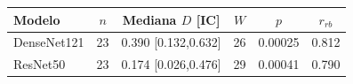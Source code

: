 \begin{tabular}{lccccc}
\toprule
Modelo & $n$ & Mediana $D$ [IC] & $W$ & $p$ & $r_{rb}$\\
\midrule
DenseNet121 & 23 & 0.390 [0.132,0.632] & 26 & 0.00025 & 0.812\\
ResNet50 & 23 & 0.174 [0.026,0.476] & 29 & 0.00041 & 0.790\\
\bottomrule
\end{tabular}